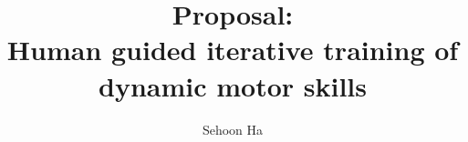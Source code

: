 \documentclass[12pt]{gatech-thesis}
\title{Proposal: \protect\\ Human guided iterative training of dynamic motor skills} %
\author{Sehoon Ha}
\begin{document}


\begin{preliminary}
\contents



\end{preliminary}




\end{document}
